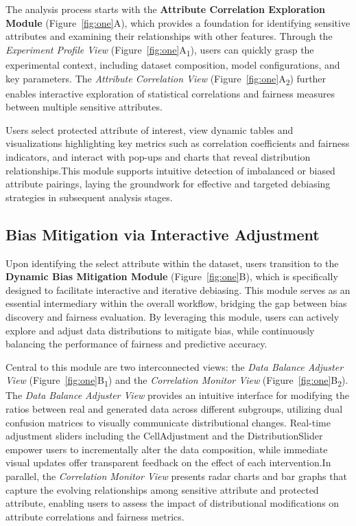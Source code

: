 \documentclass[sigconf]{acmart}
\begin{document}
The analysis process starts with the \textbf{Attribute Correlation Exploration Module} (Figure~\ref{fig:one}A), which provides a foundation for identifying sensitive attributes and examining their relationships with other features. Through the \textit{Experiment Profile View} (Figure~\ref{fig:one}A\textsubscript{1}), users can quickly grasp the experimental context, including dataset composition, model configurations, and key parameters. The \textit{Attribute Correlation View} (Figure~\ref{fig:one}A\textsubscript{2}) further enables interactive exploration of statistical correlations and fairness measures between multiple sensitive attributes. 

Users select protected attribute of interest, view dynamic tables and visualizations highlighting key metrics such as correlation coefficients and fairness indicators, and interact with pop-ups and charts that reveal distribution relationships.This module supports intuitive detection of imbalanced or biased attribute pairings, laying the groundwork for effective and targeted debiasing strategies in subsequent analysis stages.



\subsection{Bias Mitigation via Interactive Adjustment}

Upon identifying the select attribute within the dataset, users transition to the \textbf{Dynamic Bias Mitigation Module} (Figure~\ref{fig:one}B), which is specifically designed to facilitate interactive and iterative debiasing. This module serves as an essential intermediary within the overall workflow, bridging the gap between bias discovery and fairness evaluation. By leveraging this module, users can actively explore and adjust data distributions to mitigate bias, while continuously balancing the performance of fairness and predictive accuracy.

Central to this module are two interconnected views: the \textit{Data Balance Adjuster View} (Figure~\ref{fig:one}B\textsubscript{1}) and the \textit{Correlation Monitor View} (Figure~\ref{fig:one}B\textsubscript{2}). The \textit{Data Balance Adjuster View} provides an intuitive interface for modifying the ratios between real and generated data across different subgroups, utilizing dual confusion matrices to visually communicate distributional changes. Real-time adjustment sliders including the CellAdjustment and the DistributionSlider empower users to incrementally alter the data composition, while immediate visual updates offer transparent feedback on the effect of each intervention.In parallel, the \textit{Correlation Monitor View} presents radar charts and bar graphs that capture the evolving relationships among sensitive attribute and protected attribute, enabling users to assess the impact of distributional modifications on attribute correlations and fairness metrics.
\end{document}
